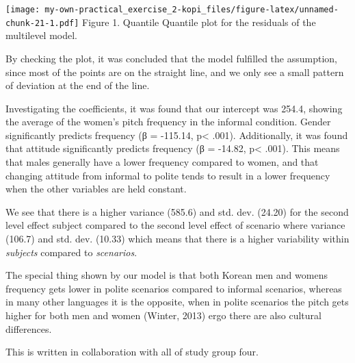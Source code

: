 \documentclass[
]{article}
\begin{document}
\texttt{[image: my-own-practical\_exercise\_2-kopi\_files/figure-latex/unnamed-chunk-21-1.pdf]}
Figure 1. Quantile Quantile plot for the residuals of the multilevel
model.

By checking the plot, it was concluded that the model fulfilled the
assumption, since most of the points are on the straight line, and we
only see a small pattern of deviation at the end of the line.

Investigating the coefficients, it was found that our intercept was
254.4, showing the average of the women's pitch frequency in the
informal condition. Gender significantly predicts frequency (β =
-115.14, p\textless{} .001). Additionally, it was found that attitude
significantly predicts frequency (β = -14.82, p\textless{} .001). This
means that males generally have a lower frequency compared to women, and
that changing attitude from informal to polite tends to result in a
lower frequency when the other variables are held constant.

We see that there is a higher variance (585.6) and std. dev. (24.20) for
the second level effect subject compared to the second level effect of
scenario where variance (106.7) and std. dev. (10.33) which means that
there is a higher variability within \emph{subjects} compared to
\emph{scenarios}.

The special thing shown by our model is that both Korean men and womens
frequency gets lower in polite scenarios compared to informal scenarios,
whereas in many other languages it is the opposite, when in polite
scenarios the pitch gets higher for both men and women (Winter, 2013)
ergo there are also cultural differences.

This is written in collaboration with all of study group four.
\end{document}
